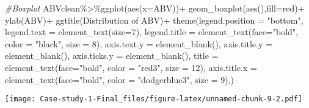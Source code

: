 \documentclass[
]{article}
\newenvironment{Shaded}{\begin{snugshade}}{\end{snugshade}}
\newcommand{\AttributeTok}[1]{\textcolor[rgb]{0.77,0.63,0.00}{#1}}
\newcommand{\CommentTok}[1]{\textcolor[rgb]{0.56,0.35,0.01}{\textit{#1}}}
\newcommand{\DecValTok}[1]{\textcolor[rgb]{0.00,0.00,0.81}{#1}}
\newcommand{\FunctionTok}[1]{\textcolor[rgb]{0.00,0.00,0.00}{#1}}
\newcommand{\NormalTok}[1]{#1}
\newcommand{\OtherTok}[1]{\textcolor[rgb]{0.56,0.35,0.01}{#1}}
\newcommand{\SpecialCharTok}[1]{\textcolor[rgb]{0.00,0.00,0.00}{#1}}
\newcommand{\StringTok}[1]{\textcolor[rgb]{0.31,0.60,0.02}{#1}}
\begin{document}
\begin{Shaded}
\begin{Highlighting}[]
\CommentTok{\#Boxplot}
\NormalTok{ABVclean}\SpecialCharTok{\%\textgreater{}\%}\FunctionTok{ggplot}\NormalTok{(}\FunctionTok{aes}\NormalTok{(}\AttributeTok{x=}\NormalTok{ABV))}\SpecialCharTok{+}
  \FunctionTok{geom\_boxplot}\NormalTok{(}\FunctionTok{aes}\NormalTok{(),}\AttributeTok{fill=}\StringTok{\textquotesingle{}red\textquotesingle{}}\NormalTok{)}\SpecialCharTok{+}
  \FunctionTok{ylab}\NormalTok{(}\StringTok{\textquotesingle{}ABV\textquotesingle{}}\NormalTok{)}\SpecialCharTok{+}
  \FunctionTok{ggtitle}\NormalTok{(}\StringTok{\textquotesingle{}Distribution of ABV\textquotesingle{}}\NormalTok{)}\SpecialCharTok{+}
  \FunctionTok{theme}\NormalTok{(}\AttributeTok{legend.position =} \StringTok{"bottom"}\NormalTok{,}
        \AttributeTok{legend.text =} \FunctionTok{element\_text}\NormalTok{(}\AttributeTok{size=}\DecValTok{7}\NormalTok{),}
        \AttributeTok{legend.title =} \FunctionTok{element\_text}\NormalTok{(}\AttributeTok{face=}\StringTok{"bold"}\NormalTok{, }\AttributeTok{color =} \StringTok{"black"}\NormalTok{, }\AttributeTok{size =} \DecValTok{8}\NormalTok{),}
        \AttributeTok{axis.text.y =} \FunctionTok{element\_blank}\NormalTok{(),}
        \AttributeTok{axis.title.y =} \FunctionTok{element\_blank}\NormalTok{(),}
        \AttributeTok{axis.ticks.y =} \FunctionTok{element\_blank}\NormalTok{(),}
        \AttributeTok{title =} \FunctionTok{element\_text}\NormalTok{(}\AttributeTok{face=}\StringTok{"bold"}\NormalTok{, }\AttributeTok{color =} \StringTok{"red3"}\NormalTok{, }\AttributeTok{size =} \DecValTok{12}\NormalTok{),}
        \AttributeTok{axis.title.x =} \FunctionTok{element\_text}\NormalTok{(}\AttributeTok{face=}\StringTok{"bold"}\NormalTok{, }\AttributeTok{color =} \StringTok{"dodgerblue3"}\NormalTok{, }\AttributeTok{size =} \DecValTok{9}\NormalTok{),)}
\end{Highlighting}
\end{Shaded}

\texttt{[image: Case-study-1-Final\_files/figure-latex/unnamed-chunk-9-2.pdf]}

\begin{Shaded}
\end{Shaded}
\end{document}

